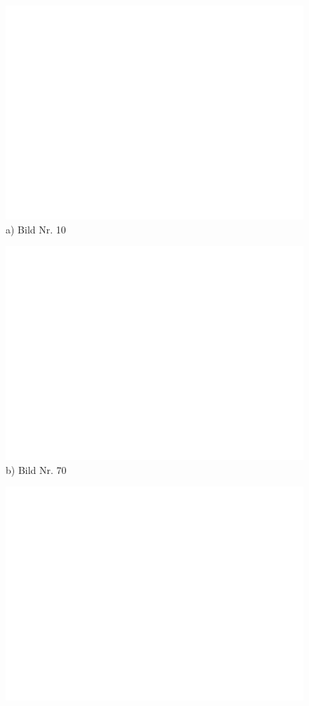 \begin{figure}[H]
\centering
  \begin{minipage}{0.3\textwidth}
    \includegraphics[width=\textwidth]{images/dummy.png}
    a) Bild Nr. 10
  \end{minipage}
  \begin{minipage}{0.3\textwidth}
    \includegraphics[width=\textwidth]{images/dummy.png}
    b) Bild Nr. 70
  \end{minipage}
  \begin{minipage}{0.3\textwidth}
    \includegraphics[width=\textwidth]{images/dummy.png}

\end{minipage}
\end{figure}
